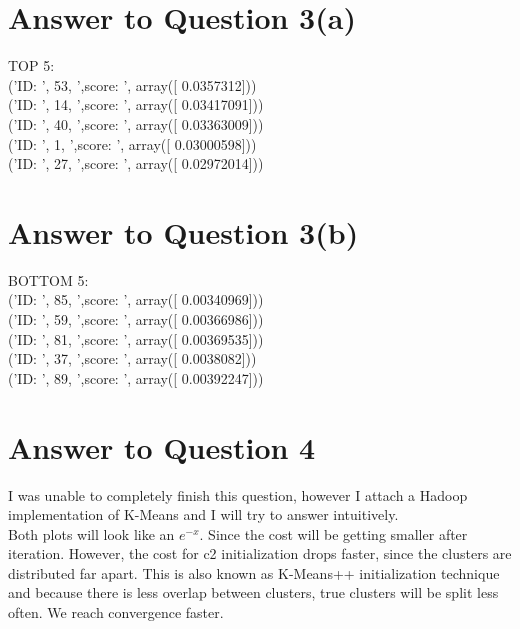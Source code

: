 \documentclass[11pt]{article}
\begin{document}
\section*{Answer to Question 3(a)}
TOP 5:\\
('ID: ', 53, ',score: ', array([ 0.0357312]))\\
('ID: ', 14, ',score: ', array([ 0.03417091]))\\
('ID: ', 40, ',score: ', array([ 0.03363009]))\\
('ID: ', 1, ',score: ', array([ 0.03000598]))\\
('ID: ', 27, ',score: ', array([ 0.02972014]))\\
\section*{Answer to Question 3(b)}

BOTTOM 5:\\
('ID: ', 85, ',score: ', array([ 0.00340969]))\\
('ID: ', 59, ',score: ', array([ 0.00366986]))\\
('ID: ', 81, ',score: ', array([ 0.00369535]))\\
('ID: ', 37, ',score: ', array([ 0.0038082]))\\
('ID: ', 89, ',score: ', array([ 0.00392247]))\\

\section*{Answer to Question 4}
I was unable to completely finish this question, however I attach a Hadoop implementation of K-Means and I will try to answer intuitively. \\
Both plots will look like an $e^{-x}$. Since the cost will be getting smaller after iteration. 
However, the cost for c2 initialization drops faster, since the clusters are distributed far apart. This is also known as K-Means++ initialization technique and because there is less overlap between clusters, true clusters will be split less often. We reach convergence faster. 
\end{document}
